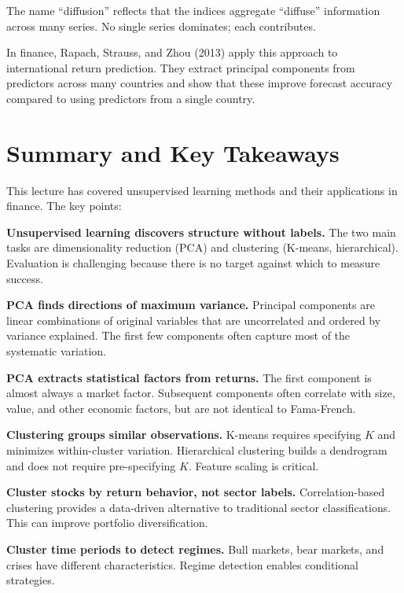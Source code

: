 \documentclass[11pt,a4paper]{article}
\begin{document}
The name ``diffusion'' reflects that the indices aggregate ``diffuse'' information across many series. No single series dominates; each contributes.

In finance, Rapach, Strauss, and Zhou (2013) apply this approach to international return prediction. They extract principal components from predictors across many countries and show that these improve forecast accuracy compared to using predictors from a single country.

\section{Summary and Key Takeaways}

This lecture has covered unsupervised learning methods and their applications in finance. The key points:

\textbf{Unsupervised learning discovers structure without labels.} The two main tasks are dimensionality reduction (PCA) and clustering (K-means, hierarchical). Evaluation is challenging because there is no target against which to measure success.

\textbf{PCA finds directions of maximum variance.} Principal components are linear combinations of original variables that are uncorrelated and ordered by variance explained. The first few components often capture most of the systematic variation.

\textbf{PCA extracts statistical factors from returns.} The first component is almost always a market factor. Subsequent components often correlate with size, value, and other economic factors, but are not identical to Fama-French.

\textbf{Clustering groups similar observations.} K-means requires specifying $K$ and minimizes within-cluster variation. Hierarchical clustering builds a dendrogram and does not require pre-specifying $K$. Feature scaling is critical.

\textbf{Cluster stocks by return behavior, not sector labels.} Correlation-based clustering provides a data-driven alternative to traditional sector classifications. This can improve portfolio diversification.

\textbf{Cluster time periods to detect regimes.} Bull markets, bear markets, and crises have different characteristics. Regime detection enables conditional strategies.
\end{document}
